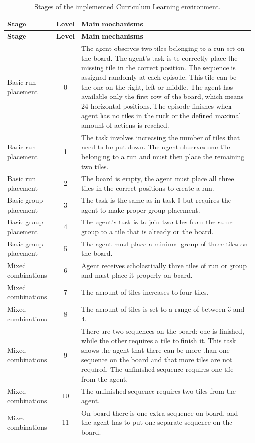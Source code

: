 \begin{longtable}{p{5cm} c p{8cm}}
	\caption{Stages of the implemented Curriculum Learning environment.}
	\label{tab:CL_seg}\\
	
	\toprule
	\textbf{Stage} &
	\textbf{Level} &
	\textbf{Main mechanisms} \\
	\midrule
	\endfirsthead
	
	\toprule
	\textbf{Stage} &
	\textbf{Level} &
	\textbf{Main mechanisms} \\
	\midrule
	\endhead
	
	\midrule
	\endfoot
	
	\bottomrule
	\endlastfoot
	Basic run placement & 0 & The agent observes two tiles belonging to a run set on the board. The agent's task is to correctly place the missing tile in the correct position. The sequence is assigned randomly at each episode. This tile can be the one on the right, left or middle. The agent has available only the first row of the board, which means 24 horizontal positions. The episode finishes when agent has no tiles in the ruck or the defined maximal amount of actions is reached.  \\
	\midrule
	Basic run placement & 1 & The task involves increasing the number of tiles that need to be put down. The agent observes one tile belonging to a run and must then place the remaining two tiles. \\ \midrule
	Basic run placement & 2 & The board is empty, the agent must place all three tiles in the correct positions to create a run.\\ \midrule
	Basic group placement & 3 & The task is the same as in task 0 but requires the agent to make proper group placement. \\ \midrule
	Basic group placement & 4 & The agent's task is to join two tiles from the same group to a tile that is already on the board. \\ \midrule
	Basic group placement & 5 & The agent must place a minimal group of three tiles on the board. \\ \midrule
	Mixed combinations & 6 & Agent receives scholastically three tiles of run or group and must place it properly on board.  \\  \midrule
	Mixed combinations & 7 & The amount of tiles increases to four tiles. \\  \midrule
	Mixed combinations & 8 & The amount of tiles is set to a range of between 3 and 4. \\  \midrule
	Mixed combinations & 9 & There are two sequences on the board: one is finished, while the other requires a tile to finish it. This task shows the agent that there can be more than one sequence on the board and that more tiles are not required. The unfinished sequence requires one tile from the agent.\\  \midrule
	Mixed combinations & 10 & The unfinished sequence requires two tiles from the agent. \\  \midrule
	Mixed combinations & 11 & On board there is one extra sequence on board, and the agent has to put one separate sequence on the board. \\  
\end{longtable}

